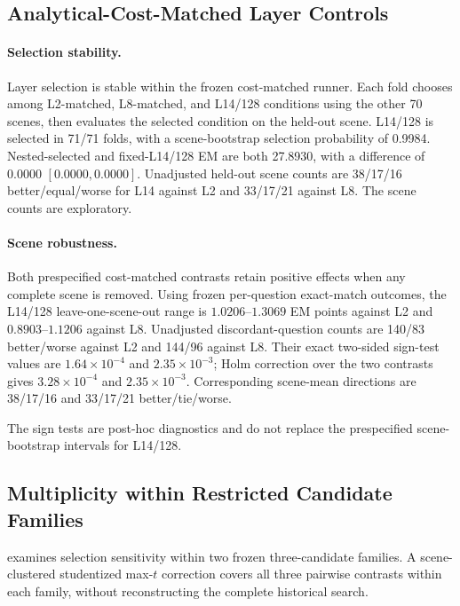 \subsection{Analytical-Cost-Matched Layer Controls}
\paragraph{Selection stability.} Layer selection is stable within the frozen cost-matched runner. Each fold chooses among L2-matched, L8-matched, and L14/128 conditions using the other 70 scenes, then evaluates the selected condition on the held-out scene. L14/128 is selected in 71/71 folds, with a scene-bootstrap selection probability of 0.9984. Nested-selected and fixed-L14/128 EM are both 27.8930, with a difference of 0.0000 $[0.0000,0.0000]$. Unadjusted held-out scene counts are 38/17/16 better/equal/worse for L14 against L2 and 33/17/21 against L8. The scene counts are exploratory.

\paragraph{Scene robustness.} Both prespecified cost-matched contrasts retain positive effects when any complete scene is removed. Using frozen per-question exact-match outcomes, the L14/128 leave-one-scene-out range is $1.0206$--$1.3069$ EM points against L2 and $0.8903$--$1.1206$ against L8. Unadjusted discordant-question counts are 140/83 better/worse against L2 and 144/96 against L8. Their exact two-sided sign-test values are $1.64\times10^{-4}$ and $2.35\times10^{-3}$; Holm correction over the two contrasts gives $3.28\times10^{-4}$ and $2.35\times10^{-3}$. Corresponding scene-mean directions are 38/17/16 and 33/17/21 better/tie/worse.

The sign tests are post-hoc diagnostics and do not replace the prespecified scene-bootstrap intervals for L14/128.

\subsection{Multiplicity within Restricted Candidate Families}
 examines selection sensitivity within two frozen three-candidate families. A scene-clustered studentized max-$t$ correction covers all three pairwise contrasts within each family, without reconstructing the complete historical search.

